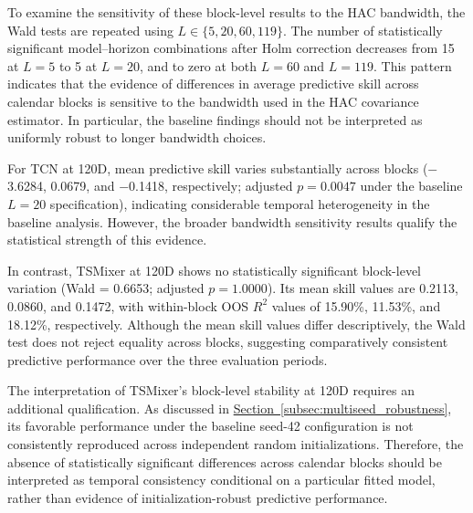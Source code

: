\documentclass[runningheads,orivec]{llncs}
\begin{document}
To examine the sensitivity of these block-level results to the HAC bandwidth, the Wald tests are repeated using $L \in \{5,20,60,119\}$. The number of statistically significant model--horizon combinations after Holm correction decreases from 15 at $L=5$ to 5 at $L=20$, and to zero at both $L=60$ and $L=119$. This pattern indicates that the evidence of differences in average predictive skill across calendar blocks is sensitive to the bandwidth used in the HAC covariance estimator. In particular, the baseline findings should not be interpreted as uniformly robust to longer bandwidth choices.

For TCN at 120D, mean predictive skill varies substantially across blocks ($-$3.6284, 0.0679, and $-$0.1418, respectively; adjusted $p=0.0047$ under the baseline $L=20$ specification), indicating considerable temporal heterogeneity in the baseline analysis. However, the broader bandwidth sensitivity results qualify the statistical strength of this evidence.

In contrast, TSMixer at 120D shows no statistically significant block-level variation (Wald = 0.6653; adjusted $p=1.0000$). Its mean skill values are 0.2113, 0.0860, and 0.1472, with within-block OOS $R^2$ values of 15.90\%, 11.53\%, and 18.12\%, respectively. Although the mean skill values differ descriptively, the Wald test does not reject equality across blocks, suggesting comparatively consistent predictive performance over the three evaluation periods.

The interpretation of TSMixer's block-level stability at 120D requires an additional qualification. As discussed in \hyperref[subsec:multiseed_robustness]{Section~\ref*{subsec:multiseed_robustness}}, its favorable performance under the baseline seed-42 configuration is not consistently reproduced across independent random initializations. Therefore, the absence of statistically significant differences across calendar blocks should be interpreted as temporal consistency conditional on a particular fitted model, rather than evidence of initialization-robust predictive performance.
\end{document}
